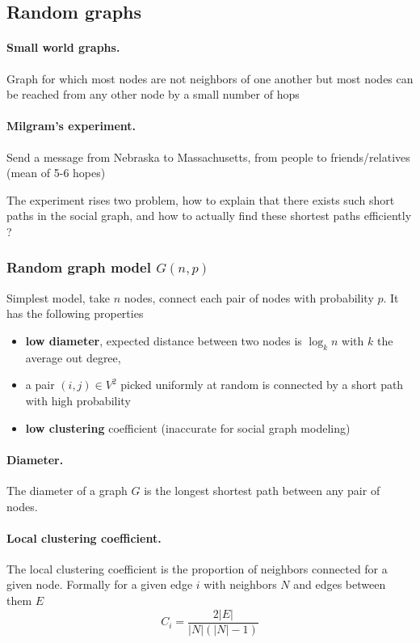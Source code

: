 \subsection{Random graphs}

\paragraph{Small world graphs.}
  Graph for which most nodes are not neighbors of one another but most nodes can be reached from any other node by a small number of hops


\paragraph{Milgram's experiment.} Send a message from Nebraska to Massachusetts, from people to friends/relatives (mean of 5-6 hopes)

The experiment rises two problem, how to explain that there exists such short paths in  the social graph, and how to actually find these shortest paths efficiently ?

\subsubsection{Random graph model $G(n,p)$}

Simplest model, take $n$ nodes, connect each pair of nodes with probability $p$. It has the following properties

\begin{itemize}
  \item \textbf{low diameter}, expected distance between two nodes is $\log_k n$ with $k$ the average out degree,
  \item a pair $(i,j) \in V^2$ picked uniformly at random is connected by a short path with high probability
  \item \textbf{low clustering} coefficient (inaccurate for social graph modeling)
\end{itemize}

\paragraph{Diameter.}
  The diameter of a graph $G$ is the longest shortest path between any pair of nodes.

\paragraph{Local clustering coefficient.}
  The local clustering coefficient is the proportion of neighbors connected for a given node. Formally for a given edge $i$ with neighbors $N$ and edges between them $E$
  \[
    C_i = \frac { 2|E|}{|N|(|N|-1)}
  \]

